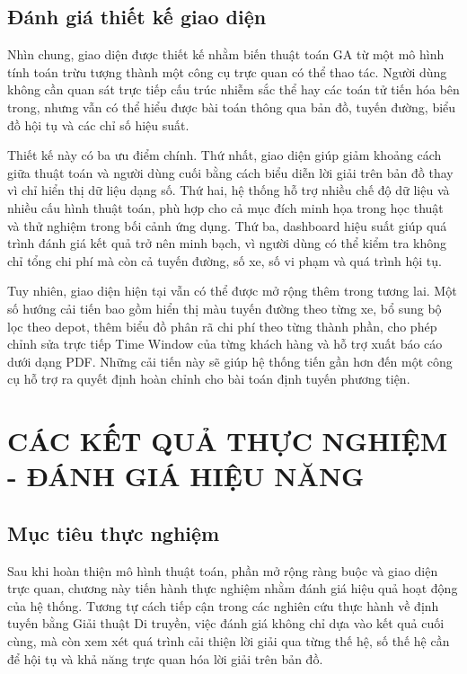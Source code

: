 \documentclass[12pt,a4paper]{article}
\numberwithin{figure}{subsection}
\begin{document}
\subsection{Đánh giá thiết kế giao diện}

Nhìn chung, giao diện được thiết kế nhằm biến thuật toán GA từ một mô hình tính toán trừu tượng thành một công cụ trực quan có thể thao tác. Người dùng không cần quan sát trực tiếp cấu trúc nhiễm sắc thể hay các toán tử tiến hóa bên trong, nhưng vẫn có thể hiểu được bài toán thông qua bản đồ, tuyến đường, biểu đồ hội tụ và các chỉ số hiệu suất.

Thiết kế này có ba ưu điểm chính. Thứ nhất, giao diện giúp giảm khoảng cách giữa thuật toán và người dùng cuối bằng cách biểu diễn lời giải trên bản đồ thay vì chỉ hiển thị dữ liệu dạng số. Thứ hai, hệ thống hỗ trợ nhiều chế độ dữ liệu và nhiều cấu hình thuật toán, phù hợp cho cả mục đích minh họa trong học thuật và thử nghiệm trong bối cảnh ứng dụng. Thứ ba, dashboard hiệu suất giúp quá trình đánh giá kết quả trở nên minh bạch, vì người dùng có thể kiểm tra không chỉ tổng chi phí mà còn cả tuyến đường, số xe, số vi phạm và quá trình hội tụ.

Tuy nhiên, giao diện hiện tại vẫn có thể được mở rộng thêm trong tương lai. Một số hướng cải tiến bao gồm hiển thị màu tuyến đường theo từng xe, bổ sung bộ lọc theo depot, thêm biểu đồ phân rã chi phí theo từng thành phần, cho phép chỉnh sửa trực tiếp Time Window của từng khách hàng và hỗ trợ xuất báo cáo dưới dạng PDF. Những cải tiến này sẽ giúp hệ thống tiến gần hơn đến một công cụ hỗ trợ ra quyết định hoàn chỉnh cho bài toán định tuyến phương tiện.

\section{CÁC KẾT QUẢ THỰC NGHIỆM - ĐÁNH GIÁ HIỆU NĂNG}

\subsection{Mục tiêu thực nghiệm}

Sau khi hoàn thiện mô hình thuật toán, phần mở rộng ràng buộc và giao diện trực quan, chương này tiến hành thực nghiệm nhằm đánh giá hiệu quả hoạt động của hệ thống. Tương tự cách tiếp cận trong các nghiên cứu thực hành về định tuyến bằng Giải thuật Di truyền, việc đánh giá không chỉ dựa vào kết quả cuối cùng, mà còn xem xét quá trình cải thiện lời giải qua từng thế hệ, số thế hệ cần để hội tụ và khả năng trực quan hóa lời giải trên bản đồ.
\end{document}
